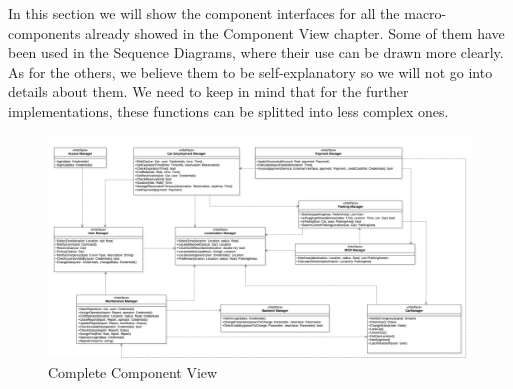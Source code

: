 	In this section we will show the component interfaces for all the macro-components already showed in the Component View chapter. Some of them have been used in the Sequence Diagrams, where their use can be drawn more clearly. As for the others, we believe them to be self-explanatory so we will not go into details about them. We need to keep in mind that for the further implementations, these functions can be splitted into less complex ones.  
		\begin{figure}
			\includegraphics[width=\hsize, center]{img/Interfaces_new.png}
			\caption{Complete Component View}
		\end{figure}